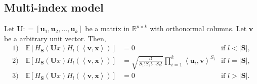 \documentclass[final,12pt]{colt2018} %
\newcommand{\E}{\mathbb{E}}
\newcommand{\R}{\mathbb{R}}
\renewcommand\v[1]{{\ensuremath{\boldsymbol{#1}}}}
\newcommand\ip[1]{\left\langle #1 \right\rangle}
\begin{document}
\subsection{Multi-index model}

\begin{lemma}
\label{lemma: multivariate_hermite_lemma_restated}
 Let $\v U : = [\v u_1, \v u_2, \dotsc, \v u_k]$ be a matrix in $\R^{p \times k}$ with orthonormal columns. Let $\v v$ be a arbitrary unit vector. Then, 
 \begin{align*}
     1) \quad \E \left[H_{\v S}(\v U x) H_l(\ip{\v v, \v x}) \right] &= 0 &\text{if $l < |\v S|$}, \\
     2) \quad \E \left[H_{\v S}(\v U x) H_l(\ip{\v v, \v x}) \right] &= \sqrt{\frac{l!}{S_1 ! S_2 ! \dotsb S_k !}} \prod_{i=1}^k \ip{\v u_i, \v v}^{S_i} &\text{if $l = |\v S|$}, \\
     3) \quad \E \left[H_{\v S}(\v U x) H_l(\ip{\v v, \v x}) \right] &= 0 &\text{if $l > |\v S|$}. \\
 \end{align*}
\end{lemma}
\end{document}
